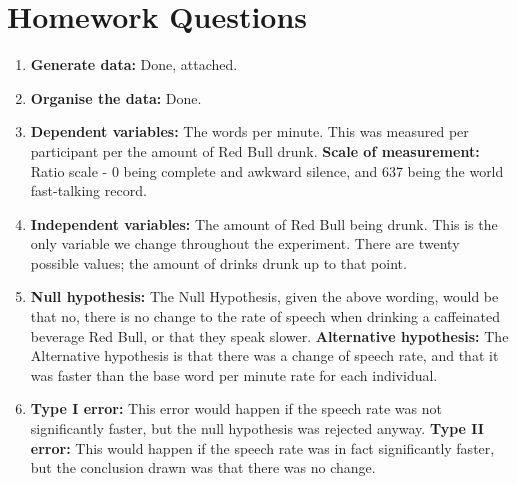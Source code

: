 \documentclass[10pt]{article}
\begin{document}
\section*{Homework Questions}
\begin{enumerate}
\item {\bf Generate data:} Done, attached.
\item {\bf Organise the data:} Done. 
\item {\bf Dependent variables:} The words per minute. This was measured per participant per the amount of Red Bull drunk. {\bf Scale of measurement:} Ratio scale - 0 being complete and awkward silence, and 637 being the world fast-talking record. 
\item {\bf Independent variables:} The amount of Red Bull being drunk. This is the only variable we change throughout the experiment. There are twenty possible values; the amount of drinks drunk up to that point. 
\item {\bf Null hypothesis:} The Null Hypothesis, given the above wording, would be that no, there is no change to the rate of speech when drinking a caffeinated beverage Red Bull, or that they speak slower. {\bf Alternative hypothesis:} The Alternative hypothesis is that there was a change of speech rate, and that it was faster than the base word per minute rate for each individual. 
\item {\bf Type I error:} This error would happen if the speech rate was not significantly faster, but the null hypothesis was rejected anyway. {\bf Type II error:} This would happen if the speech rate was in fact significantly faster, but the conclusion drawn was that there was no change. 
\end{enumerate}





















%
%
\end{document}
